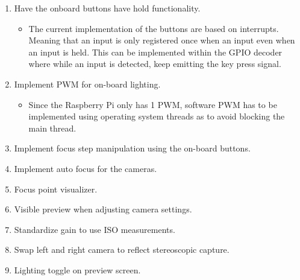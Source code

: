 \begin{enumerate}
\begin{itemize}
          \end{itemize}
	\item Have the onboard buttons have hold functionality.
          \begin{itemize}
            \item The current implementation of the buttons are based on interrupts. Meaning that an input is only registered once when an input even when an input is held. This can be implemented within the GPIO decoder where while an input is detected, keep emitting the key press signal.
          \end{itemize}
	\item Implement PWM for on-board lighting.
          \begin{itemize}
            \item Since the Raspberry Pi only has 1 PWM, software PWM has to be implemented using operating system threads as to avoid blocking the main thread.
          \end{itemize}
	\item Implement focus step manipulation using the on-board buttons.
	\item Implement auto focus for the cameras.
	\item Focus point visualizer.
	\item Visible preview when adjusting camera settings.
	\item Standardize gain to use ISO measurements.
	\item Swap left and right camera to reflect stereoscopic capture.
	\item Lighting toggle on preview screen.
\end{enumerate}